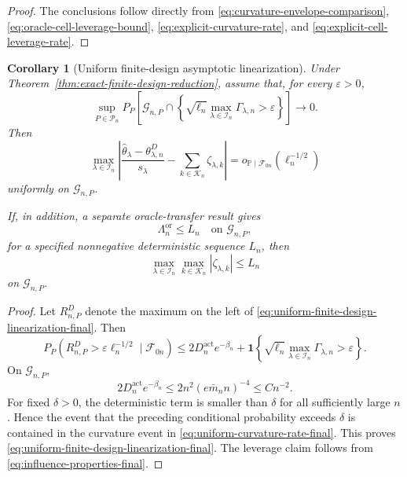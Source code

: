 \documentclass[11pt]{article}
\newtheorem{corollary}[theorem]{Corollary}
\theoremstyle{definition}
\newcommand{\1}{\mathbf 1}\newcommand{\op}{\operatorname}
\begin{document}
\begin{proof}
The conclusions follow directly from
\eqref{eq:curvature-envelope-comparison},
\eqref{eq:oracle-cell-leverage-bound},
\eqref{eq:explicit-curvature-rate}, and
\eqref{eq:explicit-cell-leverage-rate}.
\end{proof}

\begin{corollary}[Uniform finite-design asymptotic linearization]
\label{cor:uniform-finite-design-expansion}
Under Theorem~\ref{thm:exact-finite-design-reduction}, assume that,
for every $\varepsilon>0$,
\begin{equation}
\sup_{P\in\mathcal P_n}
P_P\!\left[
\mathcal G_{n,P}\cap
\left\{
\sqrt{\ell_n}
\max_{\lambda\in\mathcal I_n}
\Gamma_{\lambda,n}>\varepsilon
\right\}
\right]
\longrightarrow0.
\label{eq:uniform-curvature-rate-final}
\end{equation}
Then
\begin{equation}
\max_{\lambda\in\mathcal I_n}
\left|
\frac{\widehat\theta_\lambda-\theta_{\lambda,n}^D}{s_\lambda}
-
\sum_{k\in\mathcal K_n}\zeta_{\lambda,k}
\right|
=
o_{\mathbb P\mid\mathcal F_{0n}}(\ell_n^{-1/2})
\label{eq:uniform-finite-design-linearization-final}
\end{equation}
uniformly on $\mathcal G_{n,P}$.

If, in addition, a separate oracle-transfer result gives
\begin{equation}
\Lambda_n^{\mathrm{or}}\le L_n
\quad\text{on }\mathcal G_{n,P},
\label{eq:leverage-transfer-final}
\end{equation}
for a specified nonnegative deterministic sequence $L_n$, then
\[
\max_{\lambda\in\mathcal I_n}
\max_{k\in\mathcal K_n}
|\zeta_{\lambda,k}|
\le L_n
\]
on $\mathcal G_{n,P}$.
\end{corollary}

\begin{proof}
Let $R_{n,P}^D$ denote the maximum on the left of
\eqref{eq:uniform-finite-design-linearization-final}. Then
\[
P_P\!\left(
R_{n,P}^D>\varepsilon\ell_n^{-1/2}
\mid\mathcal F_{0n}
\right)
\le
2D_n^{\mathrm{act}}e^{-\beta_n}
+
\mathbf 1\!\left\{
\sqrt{\ell_n}
\max_{\lambda\in\mathcal I_n}\Gamma_{\lambda,n}
>\varepsilon
\right\}.
\]
On $\mathcal G_{n,P}$,
\[
2D_n^{\mathrm{act}}e^{-\beta_n}
\le
2n^2(e\bar m_nn)^{-4}
\le Cn^{-2}.
\]
For fixed $\delta>0$, the deterministic term is smaller than
$\delta$ for all sufficiently large $n$. Hence the event that the
preceding conditional probability exceeds $\delta$ is contained in
the curvature event in
\eqref{eq:uniform-curvature-rate-final}. This proves
\eqref{eq:uniform-finite-design-linearization-final}. The leverage
claim follows from \eqref{eq:influence-properties-final}.
\end{proof}
\end{document}
